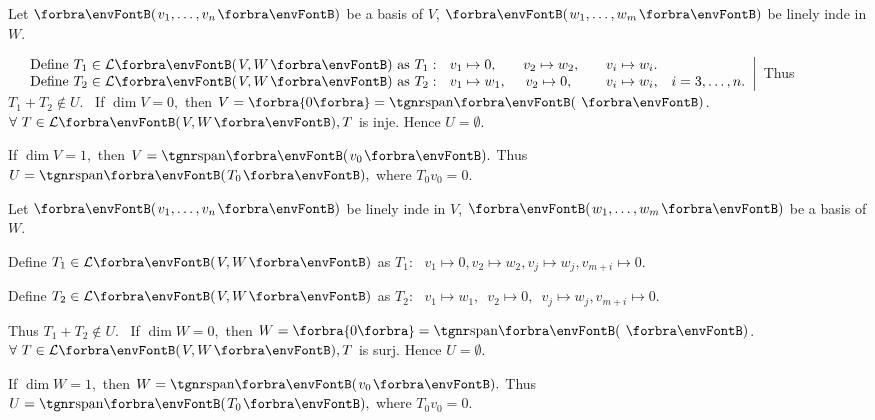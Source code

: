 \par\quad
Let $\Par{v_1,\dots,v_n}$ be a basis of $V$, $\Par{w_1,\dots,w_m}$ be linely inde in $W$. \par\,
$\MathRightMid{l}{$
Define $T_1\in\Lm{V,W}$ as $T_1:\,\,\,\,v_1\mapsto 0,$\qquad$v_2\mapsto w_2,$\qquad$v_i\mapsto w_i$.$\\$
Define $T_2\in\Lm{V,W}$ as $T_2:\,\,\,\,v_1\mapsto w_1,$ \quad\,$v_2\mapsto 0,$\,\,\,\qquad$v_i\mapsto w_i$,\quad $i=3,\dots,n.}$ Thus $T_1+T_2\not\in U.$\PfEnd\vspace{6pt}
\Comment \,\,\,If $\dim V=0,$ then $V=\zeroSubs=\Span{\,}$. $\forall\,\,T\in\Lm{V,W}, T$ is inje. Hence $U=\emptyset$.\par
\Blind{\Comment\,\,\,}If $\dim V=1,$ then $V=\Span{v_0}.$ Thus $U=\Span{T_0},$ where $T_0 v_0=0.$\par
\SepLine

\par\quad
Let $\Par{v_1,\dots,v_n}$ be linely inde in $V$, $\Par{w_1,\dots,w_m}$ be a basis of $W$. \par\quad
Define $T_1\in\Lm{V,W}$ as $T_1:\,\,\,\,v_1\mapsto 0,$\qquad$v_2\mapsto w_2,$\qquad$v_j\mapsto w_j,$\qquad$v_{m+i}\mapsto 0.$\par\quad
Define $T_2\in\Lm{V,W}$ as $T_2:\,\,\,\,v_1\mapsto w_1,$\,\,\,\quad$v_2\mapsto 0,$\,\,\,\qquad$v_j\mapsto w_j,$\qquad$v_{m+i}\mapsto 0.$\par\quad
{} Thus $T_1+T_2\not\in U.$\PfEnd\vspace{6pt}
\Comment \,\,\,If $\dim W=0,$ then $W=\zeroSubs=\Span{\,}$. $\forall\,\,T\in\Lm{V,W}, T$ is surj. Hence $U=\emptyset.$\par
\Blind{\Comment\,\,\,}If $\dim W=1,$ then $W=\Span{v_0}.$ Thus $U=\Span{T_0},$ where $T_0 v_0=0.$\par
\SepLine

